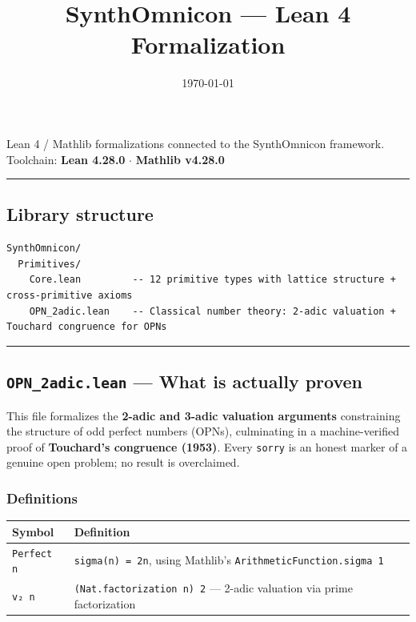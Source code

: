 \documentclass[12pt,a4paper]{article}
\begin{document}
\title{SynthOmnicon --- Lean 4 Formalization}
\date{\today}

\maketitle

Lean 4 / Mathlib formalizations connected to the SynthOmnicon framework.
Toolchain: \textbf{Lean 4.28.0} $\cdot$ \textbf{Mathlib v4.28.0}

\begin{center}
\rule{0.5\textwidth}{0.4pt}
\end{center}

\subsection{Library structure}

\begin{lstlisting}
SynthOmnicon/
  Primitives/
    Core.lean         -- 12 primitive types with lattice structure + cross-primitive axioms
    OPN_2adic.lean    -- Classical number theory: 2-adic valuation + Touchard congruence for OPNs
\end{lstlisting}

\begin{center}
\rule{0.5\textwidth}{0.4pt}
\end{center}

\subsection{\texttt{OPN\_2adic.lean} --- What is actually proven}

This file formalizes the \textbf{2-adic and 3-adic valuation arguments} constraining the structure of
odd perfect numbers (OPNs), culminating in a machine-verified proof of \textbf{Touchard's congruence
(1953)}. Every \texttt{sorry} is an honest marker of a genuine open problem; no result is overclaimed.

\subsubsection{Definitions}

\begin{table}[htbp]
\centering
\small
{}
\begin{tabularx}{\textwidth}{>{\centering\arraybackslash}X >{\centering\arraybackslash}X}
\toprule
\rowcolor{gray!25}\textbf{Symbol} & \textbf{Definition} \\
\midrule
\rowcolors{1}{white}{gray!10}
\texttt{Perfect n} & \texttt{sigma(n) = 2n}, using Mathlib's \texttt{ArithmeticFunction.sigma 1} \\
\texttt{v₂ n} & \texttt{(Nat.factorization n) 2} --- 2-adic valuation via prime factorization \\
\bottomrule
\end{tabularx}
\end{table}
\end{document}

